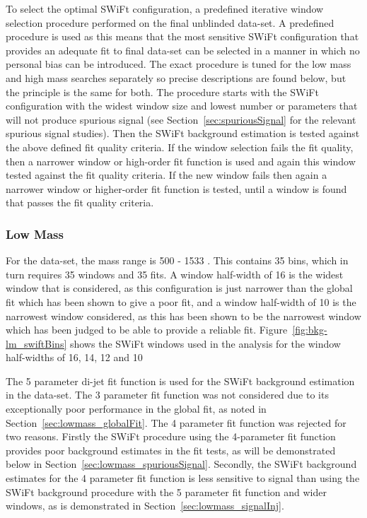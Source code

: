 To select the optimal SWiFt configuration, a predefined iterative window selection procedure performed on the final unblinded data-set.
A predefined procedure is used as this means that the most sensitive SWiFt configuration that provides an adequate fit to final data-set can be selected
in a manner in which no personal bias can be introduced.
The exact procedure is tuned for the low mass and high mass searches separately so precise descriptions are found below,
but the principle is the same for both.
The procedure starts with the SWiFt configuration with the widest window size and lowest number or parameters that will not produce spurious signal
(see Section~\ref{sec:spuriousSignal} for the relevant spurious signal studies).
Then the SWiFt background estimation is tested against the above defined fit quality criteria.
If the window selection fails the fit quality, then a narrower window or high-order fit function is used and again this window tested against the fit quality criteria.
If the new window fails then again a narrower window or higher-order fit function is tested, until a window is found that passes the fit quality criteria.


\subsubsection{Low Mass}
\label{sec:lowmass_windowSel}

For the \lm{} data-set, the mass range is 500 - 1533 \GeV{}. This contains 35 bins, which in turn requires 35 windows and 35 fits.
A window half-width of 16 is  the widest window that is considered,
as this configuration is just narrower than the global fit which has been shown to give a poor fit,
and a window half-width of 10 is the narrowest window considered,
as this has been shown to be the narrowest window which has been judged to be able to provide a reliable fit.
Figure~\ref{fig:bkg-lm_swiftBins} shows the SWiFt windows used in the \lm{} analysis for the window half-widths of 16, 14, 12 and 10

The 5 parameter di-jet fit function is used for the SWiFt background estimation in the \lm{} data-set.
The 3 parameter fit function was not considered due to its exceptionally poor performance in the global fit, as noted in Section~\ref{sec:lowmass_globalFit}.
The 4 parameter fit function was rejected for two reasons.
Firstly the SWiFt procedure using the 4-parameter fit function provides poor background estimates in the fit tests,
as will be demonstrated below in Section~\ref{sec:lowmass_spuriousSignal}.
Secondly, the SWiFt background estimates for the 4 parameter fit function is less sensitive to signal than
using the SWiFt background procedure with the 5 parameter fit function and wider windows, as is demonstrated in Section~\ref{sec:lowmass_signalInj}.

